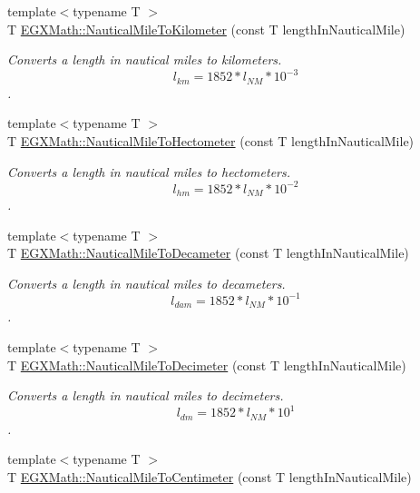 \begin{DoxyCompactItemize}
{\footnotesize template$<$typename T $>$ }\\T \mbox{\hyperlink{group___e_g_x_math-_conversions-_length_conversions-_nautical-_nautical_mile-_s_i_ga3bdd35fac83cfac8d0f6cfc789d1c8f4}{E\+G\+X\+Math\+::\+Nautical\+Mile\+To\+Kilometer}} (const T length\+In\+Nautical\+Mile)
\begin{DoxyCompactList}\small\item\em Converts a length in nautical miles to kilometers. \[ l_{km}=1852 * l_{NM} * 10^{-3} \]. \end{DoxyCompactList}\item 
{\footnotesize template$<$typename T $>$ }\\T \mbox{\hyperlink{group___e_g_x_math-_conversions-_length_conversions-_nautical-_nautical_mile-_s_i_gab23b612d39bfe199f77deb6d8d3d044d}{E\+G\+X\+Math\+::\+Nautical\+Mile\+To\+Hectometer}} (const T length\+In\+Nautical\+Mile)
\begin{DoxyCompactList}\small\item\em Converts a length in nautical miles to hectometers. \[ l_{hm}=1852 * l_{NM} * 10^{-2} \]. \end{DoxyCompactList}\item 
{\footnotesize template$<$typename T $>$ }\\T \mbox{\hyperlink{group___e_g_x_math-_conversions-_length_conversions-_nautical-_nautical_mile-_s_i_gaec7c0bd4b19a2301d5033e19bac6e6eb}{E\+G\+X\+Math\+::\+Nautical\+Mile\+To\+Decameter}} (const T length\+In\+Nautical\+Mile)
\begin{DoxyCompactList}\small\item\em Converts a length in nautical miles to decameters. \[ l_{dam}=1852 * l_{NM} * 10^{-1} \]. \end{DoxyCompactList}\item 
{\footnotesize template$<$typename T $>$ }\\T \mbox{\hyperlink{group___e_g_x_math-_conversions-_length_conversions-_nautical-_nautical_mile-_s_i_gabd0d42a12028a741852737b122d60f28}{E\+G\+X\+Math\+::\+Nautical\+Mile\+To\+Decimeter}} (const T length\+In\+Nautical\+Mile)
\begin{DoxyCompactList}\small\item\em Converts a length in nautical miles to decimeters. \[ l_{dm}=1852 * l_{NM} * 10^{1} \]. \end{DoxyCompactList}\item 
{\footnotesize template$<$typename T $>$ }\\T \mbox{\hyperlink{group___e_g_x_math-_conversions-_length_conversions-_nautical-_nautical_mile-_s_i_gae387f69d6b598c6f2381c33684fd9afe}{E\+G\+X\+Math\+::\+Nautical\+Mile\+To\+Centimeter}} (const T length\+In\+Nautical\+Mile)

\end{DoxyCompactItemize}

